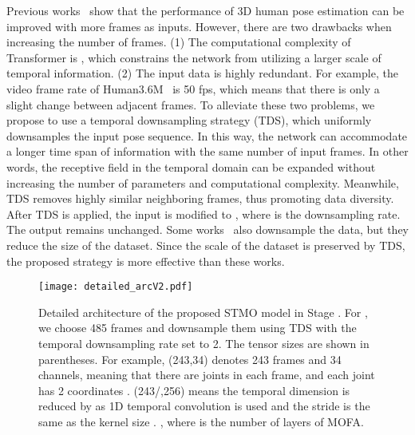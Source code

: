 \documentclass[]{llncs}
\newcommand{\RNum}[1]{\uppercase\expandafter{\romannumeral #1\relax}}
\begin{document}
Previous works~\cite{pavllo20193d,chen2021anatomy} show that the performance of 3D human pose estimation can be improved with more frames as inputs. However, there are two drawbacks when increasing the number of frames. (1) The computational complexity of Transformer is , which constrains the network from utilizing a larger scale of temporal information. (2) The input data is highly redundant. For example, the video frame rate of Human3.6M~\cite{ionescu2013human3} is 50 fps, which means that there is only a slight change between adjacent frames. To alleviate these two problems, we propose to use a temporal downsampling strategy (TDS), which uniformly downsamples the input pose sequence. In this way, the network can accommodate a longer time span of information with the same number of input frames. In other words, the receptive field in the temporal domain can be expanded without increasing the number of parameters and computational complexity. Meanwhile, TDS removes highly similar neighboring frames, thus promoting data diversity. After TDS is applied, the input  is modified to , where  is the downsampling rate. The output  remains unchanged. Some works~\cite{mehta2017vnect,ionescu2014iterated,zhou2016sparseness} also downsample the data, but they reduce the size of the dataset. Since the scale of the dataset is preserved by TDS, the proposed strategy is more effective than these works.

\begin{figure}[t]
\centering
\texttt{[image: detailed\_arcV2.pdf]}
\vspace{-0.6cm}
\caption{Detailed architecture of the proposed STMO model in Stage \RNum{2}. For , we choose 485 frames and downsample them using TDS with the temporal downsampling rate  set to 2. The tensor sizes are shown in parentheses. For example, (243,34) denotes 243 frames and 34 channels, meaning that there are  joints in each frame, and each joint has 2 coordinates . (243/,256) means the temporal dimension is reduced by  as 1D temporal convolution is used and the stride is the same as the kernel size . , where  is the number of layers of MOFA. }
\vspace{-0.4cm}
\label{fig:detailed_arc}
\end{figure}
\end{document}
